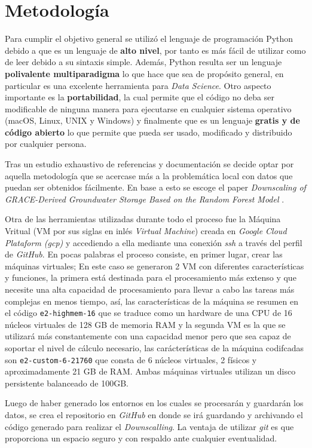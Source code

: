 \chapter{Metodología}
\label{C3}
Para cumplir el objetivo general se utilizó el lenguaje de programación Python debido a que es un lenguaje de \textbf{alto nivel}, por tanto es más fácil de utilizar como de leer debido a su sintaxis simple.
Además, Python resulta ser un lenguaje \textbf{polivalente multiparadigma} lo que hace que sea de propósito general, en particular es una excelente herramienta para \textit{Data Science}. Otro aspecto importante es la
\textbf{portabilidad}, la cual permite que el código no deba ser modificable de ninguna manera para ejecutarse en cualquier sistema operativo (macOS, Linux, UNIX y Windows) y finalmente que es un lenguaje
\textbf{gratis y de código abierto} lo que permite que pueda ser usado, modificado y distribuido por cualquier persona.

Tras un estudio exhaustivo de referencias y documentación se decide optar por aquella metodología
que se acercase más a la problemática local con datos que puedan ser obtenidos fácilmente. En base a esto se escoge el paper \textit{Downscaling of GRACE-Derived Groundwater Storage
Based on the Random Forest Model} \cite{11}. 

Otra de las herramientas utilizadas durante todo el proceso fue la Máquina Vritual (VM por sus siglas en inlés \textit{Virtual Machine}) creada en 
\textit{Google Cloud Plataform (gcp)} y accediendo a ella mediante una conexión \textit{ssh} a través del perfil de \textit{GitHub}. En pocas palabras el proceso consiste, en primer lugar, crear las máquinas virtuales;
En este caso se generaron 2 VM con diferentes características y funciones, la primera está destinada para el procesamiento más extenso y que necesite una alta capacidad de procesamiento para llevar a cabo las tareas más complejas en menos tiempo,
así, las características de la máquina se resumen en el código \texttt{e2-highmem-16} que se traduce como un hardware de una CPU de 16 núcleos virtuales de 128 GB de memoria RAM y la segunda VM es la que se utilizará
más constantemente con una capacidad menor pero que sea capaz de soportar el nivel de cálculo necesario, las carácterísticas de la máquina codifcadas son \texttt{e2-custom-6-21760} que consta de 6 núcleos virtuales,
2 físicos y aproximadamente 21 GB de RAM. Ambas máquinas virtuales utilizan un disco persistente balanceado de 100GB. 

Luego de haber generado los entornos en los cuales se procesarán y guardarán los datos, se crea el repositorio en \textit{GitHub} en 
donde se irá guardando y archivando el código generado para realizar el \textit{Downscalling}. La ventaja de utilizar \textit{git} es que proporciona un espacio seguro y con respaldo ante cualquier eventualidad.

